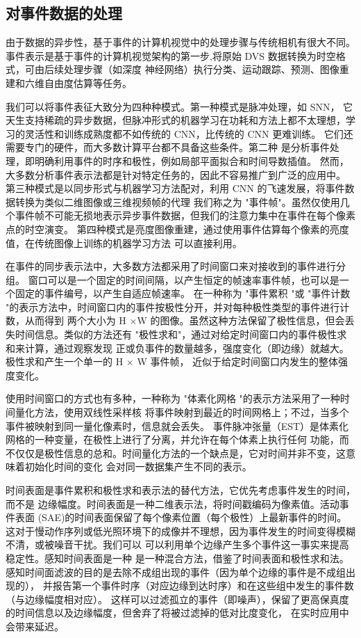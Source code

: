 \subsection{对事件数据的处理}
由于数据的异步性，基于事件的计算机视觉中的处理步骤与传统相机有很大不同。
事件表示是基于事件的计算机视觉架构的第一步,将原始 DVS 数据转换为时空格式，可由后续处理步骤（如深度
神经网络）执行分类、运动跟踪、预测、图像重建和六维自由度估算等任务。

我们可以将事件表征大致分为四种种模式。第一种模式是脉冲处理，如 SNN，
它天生支持稀疏的异步数据，但脉冲形式的机器学习在功耗和方法上都不太理想，学习的灵活性和训练成熟度都不如传统的 CNN，比传统的 CNN 更难训练。
它们还需要专门的硬件，而大多数计算平台都不具备这些条件。第二种
是分析事件处理，即明确利用事件的时序和极性，例如局部平面拟合和时间导数插值。
然而，大多数分析事件表示法都是针对特定任务的，因此不容易推广到广泛的应用中。
第三种模式是以同步形式与机器学习方法配对，利用 CNN 的飞速发展，将事件数据转换为类似二维图像或三维视频帧的代理
我们称之为 "事件帧"。虽然仅使用几个事件帧不可能无损地表示异步事件数据，但我们的注意力集中在事件在每个像素点的时空演变。
第四种模式是亮度图像重建，通过使用事件估算每个像素的亮度值，在传统图像上训练的机器学习方法
可以直接利用。

在事件的同步表示法中，大多数方法都采用了时间窗口来对接收到的事件进行分组。
窗口可以是一个固定的时间间隔，以产生恒定的帧速率事件帧，也可以是一个固定的事件编号，以产生自适应帧速率。
在一种称为 "事件累积 "或 "事件计数 "的表示方法中，时间窗口内的事件按极性分开，并对每种极性类型的事件进行计数，从而得到
两个大小为 H ×W 的图像。虽然这种方法保留了极性信息，但会丢失时间信息。类似的方法还有 "极性求和"，通过对给定时间窗口内的事件极性求和来计算，通过观察发现
正或负事件的数量越多，强度变化（即边缘）就越大。极性求和产生一个单一的 H × W 事件帧，
近似于给定时间窗口内发生的整体强度变化。

使用时间窗口的方式也有多种，一种称为 "体素化网格 "的表示方法采用了一种时间量化方法，使用双线性采样核
将事件映射到最近的时间网格上；不过，当多个事件被映射到同一量化像素时，信息就会丢失。
事件脉冲张量（EST）是体素化网格的一种变量，在极性上进行了分离，并允许在每个体素上执行任何
功能，而不仅仅是极性信息的总和。时间量化方法的一个缺点是，它对时间并非不变，这意味着初始化时间的变化
会对同一数据集产生不同的表示。

时间表面是事件累积和极性求和表示法的替代方法，它优先考虑事件发生的时间，而不是
边缘幅度。时间表面是一种二维表示法，将时间戳编码为像素值。活动事件表面
(SAE)的时间表面保留了每个像素位置（每个极性）上最新事件的时间。
这对于慢动作序列或低光照环境下的成像并不理想，因为事件发生的时间变得模糊不清，或被噪音干扰。我们可以
可以利用单个边缘产生多个事件这一事实来提高稳定性。感知时间表面是一种
是一种混合方法，借鉴了时间表面和极性求和法。感知时间面滤波的目的是去除不成组出现的事件（因为单个边缘的事件是不成组出现的），
并报告第一个事件时序（对应边缘到达时序）和在这些组中发生的事件数（与边缘幅度相对应）。
这样可以过滤孤立的事件（即噪声），保留了更高保真度的时间信息以及边缘幅度，但舍弃了将被过滤掉的低对比度变化，
在实时应用中会带来延迟。

